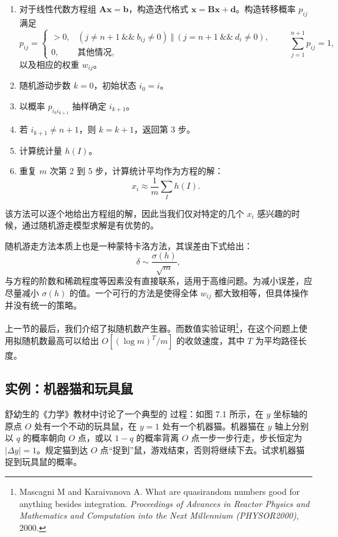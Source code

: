 \begin{algorithmBox}
\begin{enumerate}[label=\arabic*.,leftmargin=2em]
\item 对于线性代数方程组 $\mathbf A\bm x=\bm b$，构造迭代格式 $\bm x=\mathbf B\bm x+\bm d$。构造转移概率 $p_{ij}$ 满足
\[
 p_{ij}=\begin{cases}
 >0,&(j\ne n+1\ \&\&\ b_{ij}\ne0)\ \Vert\ (j=n+1\ \&\&\ d_i\ne0),\\
 0,&\text{其他情况},
 \end{cases}
 \qquad
 \sum_{j=1}^{n+1}p_{ij}=1,
\]
以及相应的权重 $w_{ij}$。
\item 随机游动步数 $k=0$，初始状态 $i_0=i$。
\item 以概率 $p_{i_ki_{k+1}}$ 抽样确定 $i_{k+1}$。
\item 若 $i_{k+1}\ne n+1$，则 $k=k+1$，返回第 3 步。
\item 计算统计量 $h(I)$。
\item 重复 $m$ 次第 2 到 5 步，计算统计平均作为方程的解：
\[
 x_i\approx\frac1m\sum_I h(I).
\]
\end{enumerate}
\end{algorithmBox}

该方法可以逐个地给出方程组的解，因此当我们仅对特定的几个 $x_i$ 感兴趣的时候，通过随机游走模型求解是有优势的。

随机游走方法本质上也是一种蒙特卡洛方法，其误差由下式给出：
\begin{equation}
 \delta\sim\frac{\sigma(h)}{\sqrt m},
\tag{7.2.16}
\end{equation}
与方程的阶数和稀疏程度等因素没有直接联系，适用于高维问题。为减小误差，应尽量减小 $\sigma(h)$ 的值。一个可行的方法是使得全体 $w_{ij}$ 都大致相等，但具体操作并没有统一的策略。

上一节的最后，我们介绍了拟随机数产生器。而数值实验证明\footnote{Mascagni M and Karaivanova A. What are quasirandom numbers good for anything besides integration. \emph{Proceedings of Advances in Reactor Physics and Mathematics and Computation into the Next Millennium (PHYSOR2000)}, 2000.}，在这个问题上使用拟随机数最高可以给出 $O[(\log m)^T/m]$ 的收敛速度，其中 $T$ 为平均路径长度。

\subsection{实例：机器猫和玩具鼠}

舒幼生的《力学》教材中讨论了一个典型的  过程：如图 7.1 所示，在 $y$ 坐标轴的原点 $O$ 处有一个不动的玩具鼠，在 $y=1$ 处有一个机器猫。机器猫在 $y$ 轴上分别以 $q$ 的概率朝向 $O$ 点，或以 $1-q$ 的概率背离 $O$ 点一步一步行走，步长恒定为 $|\Delta y|=1$。规定猫到达 $O$ 点“捉到”鼠，游戏结束，否则将继续下去。试求机器猫捉到玩具鼠的概率。

